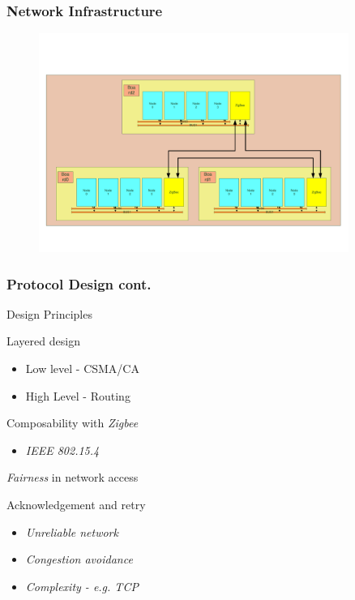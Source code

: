 \documentclass{beamer}
\theoremstyle{definition} \newtheorem{mdefinition}{Definition}
\theoremstyle{plain} \newtheorem{mtheorem}{Theorem}
\theoremstyle{plain} \newtheorem{mcorollary}{Corollary}
\theoremstyle{plain} \newtheorem{mfact}{Fact}
\begin{document}
\begin{frame}
  \frametitle{Network Infrastructure}
  \begin{figure}
    \includegraphics[width=0.9\textwidth]{img/zigbee.pdf}
  \end{figure}
\end{frame}

\begin{frame}
  \frametitle{Protocol Design cont.}
    \begin{block}{Design Principles}
      \begin{description}
      \item Layered design
        \begin{itemize}
          \item Low level - CSMA/CA
          \item High Level - Routing
        \end{itemize}
      \item Composability with \emph{Zigbee} 
        \begin{itemize}
          \item \emph{IEEE 802.15.4}
        \end{itemize}
      \item \emph{Fairness} in network access 
      \item Acknowledgement and retry  
        \begin{itemize}
        \item \emph{Unreliable network}
        \item \emph{Congestion avoidance}
        \item \emph{Complexity - e.g. TCP}
        \end{itemize}        
      \end{description}
    \end{block}
\end{frame}
\end{document}
